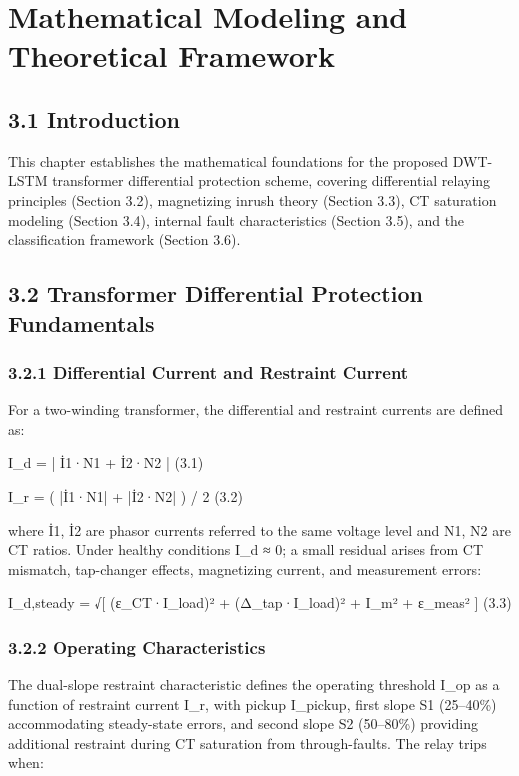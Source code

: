 \chapter{Mathematical Modeling and Theoretical Framework}
\label{ch:chapter3}


\section{3.1  Introduction}
This chapter establishes the mathematical foundations for the proposed DWT-LSTM transformer differential protection scheme, covering differential relaying principles (Section 3.2), magnetizing inrush theory (Section 3.3), CT saturation modeling (Section 3.4), internal fault characteristics (Section 3.5), and the classification framework (Section 3.6).


\section{3.2  Transformer Differential Protection Fundamentals}

\subsection{3.2.1  Differential Current and Restraint Current}
For a two-winding transformer, the differential and restraint currents are defined as:

I\_d = | İ1·N1 + İ2·N2 |	(3.1)

I\_r = ( |İ1·N1| + |İ2·N2| ) / 2	(3.2)

where İ1, İ2 are phasor currents referred to the same voltage level and N1, N2 are CT ratios. Under healthy conditions I\_d ≈ 0; a small residual arises from CT mismatch, tap-changer effects, magnetizing current, and measurement errors:

I\_d,steady = √[ (ε\_CT·I\_load)² + (Δ\_tap·I\_load)² + I\_m² + ε\_meas² ]	(3.3)


\subsection{3.2.2  Operating Characteristics}
The dual-slope restraint characteristic defines the operating threshold I\_op as a function of restraint current I\_r, with pickup I\_pickup, first slope S1 (25--40\%) accommodating steady-state errors, and second slope S2 (50--80\%) providing additional restraint during CT saturation from through-faults. The relay trips when:

